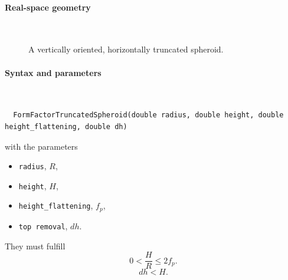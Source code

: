  \label{STruncatedSpheroid}

\paragraph{Real-space geometry}\strut\\

\begin{figure}[H]
\hfill
{}
\hfill
{}
\hfill
{}
\hfill
\caption{A vertically oriented, horizontally truncated spheroid.}
\end{figure}

\paragraph{Syntax and parameters}\strut\\[-2ex plus .2ex minus .2ex]
\begin{lstlisting}
  FormFactorTruncatedSpheroid(double radius, double height, double height_flattening, double dh)
\end{lstlisting}
with the parameters
\begin{itemize}
\item \texttt{radius}, $R$,
\item \texttt{height}, $H$,
\item \texttt{height\_flattening}, $f_p$,
\item \texttt{top removal}, $dh$.
\end{itemize}
They must fulfill
\begin{equation*}
  0< \dfrac{H}{R}\le 2f_p.
\end{equation*}
\begin{equation*}
  dh < H.
\end{equation*}

